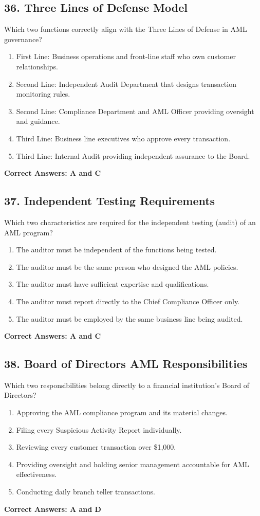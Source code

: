 \documentclass[11pt,a4paper]{article}
\begin{document}
	\subsection{36. Three Lines of Defense Model}
	Which two functions correctly align with the Three Lines of Defense in AML governance?
	\begin{enumerate}[label=\Alph*.]
		\item First Line: Business operations and front-line staff who own customer relationships.
		\item Second Line: Independent Audit Department that designs transaction monitoring rules.
		\item Second Line: Compliance Department and AML Officer providing oversight and guidance.
		\item Third Line: Business line executives who approve every transaction.
		\item Third Line: Internal Audit providing independent assurance to the Board.
	\end{enumerate}
	\textbf{Correct Answers: A and C}
	
	\subsection{37. Independent Testing Requirements}
	Which two characteristics are required for the independent testing (audit) of an AML program?
	\begin{enumerate}[label=\Alph*.]
		\item The auditor must be independent of the functions being tested.
		\item The auditor must be the same person who designed the AML policies.
		\item The auditor must have sufficient expertise and qualifications.
		\item The auditor must report directly to the Chief Compliance Officer only.
		\item The auditor must be employed by the same business line being audited.
	\end{enumerate}
	\textbf{Correct Answers: A and C}
	
	\subsection{38. Board of Directors AML Responsibilities}
	Which two responsibilities belong directly to a financial institution's Board of Directors?
	\begin{enumerate}[label=\Alph*.]
		\item Approving the AML compliance program and its material changes.
		\item Filing every Suspicious Activity Report individually.
		\item Reviewing every customer transaction over \$1,000.
		\item Providing oversight and holding senior management accountable for AML effectiveness.
		\item Conducting daily branch teller transactions.
	\end{enumerate}
	\textbf{Correct Answers: A and D}
	
\end{document}
